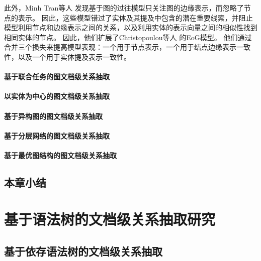 \documentclass[bachelor]{thesis-uestc}
\begin{document}
此外，Minh Tran等人 \cite{minh-tran-etal-2020-dots}发现基于图的过往模型只关注图的边缘表示，而忽略了节点的表示。
因此，这些模型错过了实体及其提及中包含的潜在重要线索，并阻止模型利用节点和边缘表示之间的关系，以及利用实体的表示向量之间的相似性找到相同实体的节点。
因此，他们扩展了Christopoulou等人 \cite{christopoulou-etal-2019-connecting}的EoG模型。
他们通过合并三个损失来提高模型表现：一个用于节点表示，一个用于结点边缘表示一致性，以及一个用于实体提及表示一致性。\par

\subsubsection{基于联合任务的图文档级关系抽取}\label{subsec:joined-graph}

\subsubsection{以实体为中心的图文档级关系抽取}\label{subsec:entity-centric-graph}

\subsubsection{基于异构图的图文档级关系抽取}\label{subsec:heterogeneous-graph}

\subsubsection{基于分层网络的图文档级关系抽取}\label{subsec:layered-graph}

\subsubsection{基于最优图结构的图文档级关系抽取}\label{subsec:optimal-graph}
\section{本章小结}

\newpage

\chapter{基于语法树的文档级关系抽取研究}

\section{基于依存语法树的文档级关系抽取}
\end{document}
